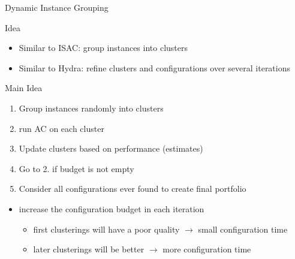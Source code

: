 \begin{frame}[c]{Dynamic Instance Grouping }

\begin{block}{Idea}
\begin{itemize}
\item Similar to ISAC: group instances into clusters
\item Similar to Hydra: refine clusters and configurations over several iterations 
\end{itemize}
\end{block}

\pause

\begin{block}{Main Idea}
\begin{enumerate}
\item Group instances randomly into clusters
\item run AC on each cluster
\item Update clusters based on performance (estimates)
\item Go to 2. if budget is not empty
\item Consider all configurations ever found to create final portfolio
\end{enumerate}

\pause

\begin{itemize}
\item increase the configuration budget in each iteration
\begin{itemize}
\item first clusterings will have a poor quality $\to$ small configuration time
\item later clusterings will be better $\to$ more configuration time
\end{itemize}
\end{itemize}

\end{block}

\end{frame}


